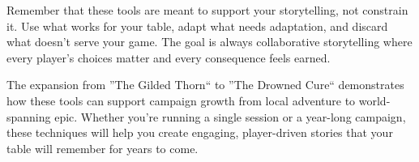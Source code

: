 \documentclass[11pt]{article}
\begin{document}
Remember that these tools are meant to support your storytelling, not constrain it. Use what works for your table, adapt what needs adaptation, and discard what doesn't serve your game. The goal is always collaborative storytelling where every player's choices matter and every consequence feels earned.

The expansion from ''The Gilded Thorn`` to ''The Drowned Cure`` demonstrates how these tools can support campaign growth from local adventure to world-spanning epic. Whether you're running a single session or a year-long campaign, these techniques will help you create engaging, player-driven stories that your table will remember for years to come.
\end{document}
